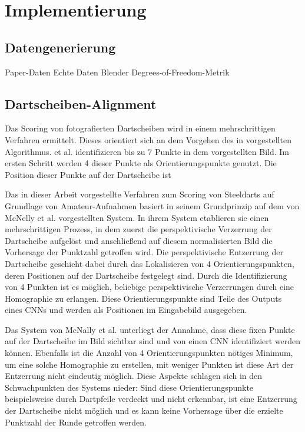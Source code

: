 \section{Implementierung}
\label{sec:impl}

\subsection{Datengenerierung}
\label{seC:impl:daten}

Paper-Daten
Echte Daten
Blender
Degrees-of-Freedom-Metrik


\subsection{Dartscheiben-Alignment}
\label{sec:impl:align}

Das Scoring von fotografierten Dartscheiben wird in einem mehrschrittigen Verfahren ermittelt. Dieses orientiert sich an dem Vorgehen des in \cite{deepdarts} vorgestellten Algorithmus. \citeauthor{deepdarts} et al. identifizieren bis zu 7 Punkte in dem vorgestellten Bild. Im ersten Schritt werden 4 dieser Punkte als Orientierungspunkte genutzt. Die Position dieser Punkte auf der Dartscheibe ist 

Das in dieser Arbeit vorgestellte Verfahren zum Scoring von Steeldarts auf Grundlage von Amateur-Aufnahmen basiert in seinem Grundprinzip auf dem von McNelly et al. vorgestellten System. In ihrem System etablieren sie einen mehrschrittigen Prozess, in dem zuerst die perspektivische Verzerrung der Dartscheibe aufgelöst und anschließend auf diesem normalisierten Bild die Vorhersage der Punktzahl getroffen wird. Die perspektivische Entzerrung der Dartscheibe geschieht dabei durch das Lokalisieren von 4 Orientierungspunkten, deren Positionen auf der Dartscheibe festgelegt sind. Durch die Identifizierung von 4 Punkten ist es möglich, beliebige perspektivische Verzerrungen durch eine Homographie zu erlangen. Diese Orientierungspunkte sind Teile des Outputs eines CNNs und werden als Positionen im Eingabebild ausgegeben.

Das System von McNally et al. unterliegt der Annahme, dass diese fixen Punkte auf der Dartscheibe im Bild sichtbar sind und von einen CNN identifiziert werden können. Ebenfalls ist die Anzahl von 4 Orientierungspunkten nötiges Minimum, um eine solche Homographie zu erstellen, mit weniger Punkten ist diese Art der Entzerrung nicht eindeutig möglich. Diese Aspekte schlagen sich in den Schwachpunkten des Systems nieder: Sind diese Orientierungspunkte beispielsweise durch Dartpfeile verdeckt und nicht erkennbar, ist eine Entzerrung der Dartscheibe nicht möglich und es kann keine Vorhersage über die erzielte Punktzahl der Runde getroffen werden.

